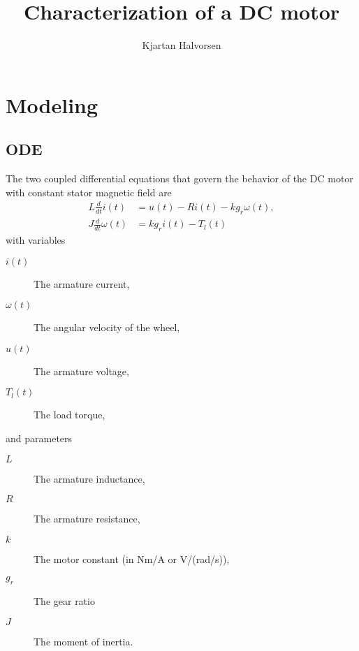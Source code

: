 \documentclass[letterpaper]{scrartcl}
\author{Kjartan Halvorsen}
\date{}
\title{Characterization of a DC motor}
\begin{document}
\maketitle

\section*{Modeling}
\label{sec:org9eca945}

\subsection*{ODE}
\label{sec:org2b1d6d7}
The two coupled differential equations that govern the behavior of the DC motor with constant stator magnetic field are
\begin{align}
L \frac{d}{dt} i(t) &= u(t) - Ri(t) - kg_r\omega(t), \label{eq:circ}\\
J \frac{d}{dt} \omega(t) &= kg_r i(t) - T_l(t)
\label{eq:newton}
\end{align}
with variables
\begin{description}
\item[{\(i(t)\)}] The armature current,
\item[{\(\omega(t)\)}] The angular velocity of the wheel,
\item[{\(u(t)\)}] The armature voltage,
\item[{\(T_l(t)\)}] The load torque,
\end{description}
and parameters
\begin{description}
\item[{\(L\)}] The armature inductance,
\item[{\(R\)}] The armature resistance,
\item[{\(k\)}] The motor constant (in Nm/A or V/(rad/s)),
\item[{\(g_r\)}] The gear ratio
\item[{\(J\)}] The moment of inertia.
\end{description}
\end{document}
